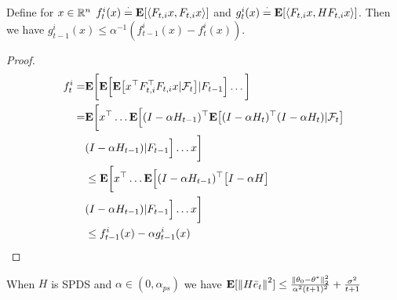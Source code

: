 \begin{lemma}
Define for $x\in \mathbb{R}^n$ $f^i_t(x)\stackrel{\cdot}{=}\mathbf{E}[\langle F_{t,i}x,F_{t,i}x\rangle]$ and $g^i_t(x)\stackrel{\cdot}{=}\mathbf{E}[\langle F_{t,i}x, H F_{t,i}x\rangle]$. Then we have $g^i_{t-1}(x)\leq \alpha^{-1}(f^i_{t-1}(x)-f^i_t(x))$.
\end{lemma}
\begin{proof}
\begin{align*}
f^i_t=&\mathbf{E}\bigg[\mathbf{E}\Big[\mathbf{E}\big[ x^\top F^\top_{t,i} F_{t,i}x|\mathcal{F}_{t}\big]|F_{t-1}\Big]\ldots\bigg]\\
=&\mathbf{E}\bigg[x^\top\ldots\mathbf{E}\Big[(I-\alpha H_{t-1})^\top\mathbf{E}\big[ (I-\alpha H_t)^\top(I-\alpha H_t)|\mathcal{F}_{t}\big]\\&(I-\alpha H_{t-1})|F_{t-1}\Big]\ldots x\bigg]\\
&\leq \mathbf{E}\bigg[x^\top\ldots\mathbf{E}\Big[(I-\alpha H_{t-1})^\top\big[I-\alpha H\big]\\&(I-\alpha H_{t-1})|F_{t-1}\Big]\ldots x\bigg]\\
&\leq f^i_{t-1}(x)-\alpha g^i_{t-1}(x)
\end{align*}
\end{proof}



\begin{theorem}\label{spdsm}
When $H$ is SPDS and $\alpha\in (0,\alpha_{ps})$ we have $\mathbf{E}[\left\| H\bar{e}_t\right\|^2]\leq \frac{\left\| \theta_0-\theta^*\right\|^2_2}{\alpha^2(t+1)^2}+\frac{\sigma^2}{t+1}$
\end{theorem}

